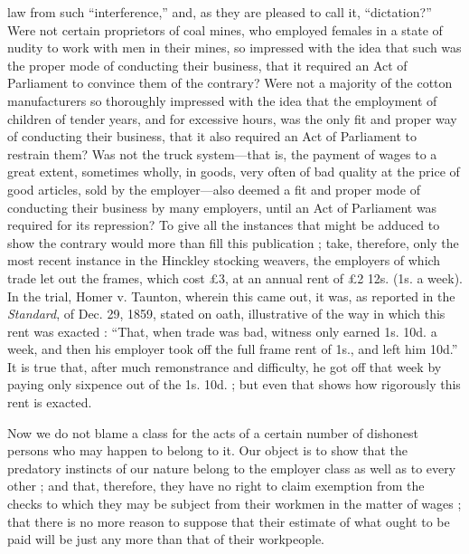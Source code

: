 law from such ``interference,'' and, as they are pleased to call it,
``dictation?'' Were not certain proprietors of coal mines, who employed
females in a state of nudity to work with men in their mines, so
impressed with the idea that such was the proper mode of conducting
their business, that it required an Act of Parliament to convince them
of the contrary? Were not a majority of the cotton manufacturers so
thoroughly impressed with the idea that the employment of children of
tender years, and for excessive hours, was the only fit and proper way
of conducting their business, that it also required an Act of Parliament
to restrain them? Was not the truck system---that is, the payment of
wages to a great extent, sometimes wholly, in goods, very often of bad
quality at the price of good articles, sold by the employer---also
deemed a fit and proper mode of conducting their business by many
employers, until an Act of Parliament was required for its repression?
To give all the instances that might be adduced to show the contrary
would more than fill this publication ; take, therefore, only the most
recent instance in the Hinckley stocking weavers, the employers of
which trade let out the frames, which cost £3, at an annual rent of
£2 12s. (1s. a week). In the trial, Homer v. Taunton, wherein this
came out, it was, as reported in the \textit{Standard}, of Dec. 29,
1859, stated on oath, illustrative of the way in which this rent was
exacted : ``That, when trade was bad, witness only earned 1s. 10d. a
week, and then his employer took off the full frame rent of 1s., and
left him 10d.'' It is true that, after much remonstrance and difficulty,
he got off that week by paying only sixpence out of the 1s. 10d. ; but
even that shows how rigorously this rent is exacted.

Now we do not blame a class for the acts of a certain number of
dishonest persons who may happen to belong to it. Our object is to show
that the predatory instincts of our nature belong to the employer class
as well as to every other ; and that, therefore, they have no right to
claim exemption from the checks to which they may be subject from their
workmen in the matter of wages ; that there is no more reason to suppose
that their estimate of what ought to be paid will be just any more than
that of their workpeople.

